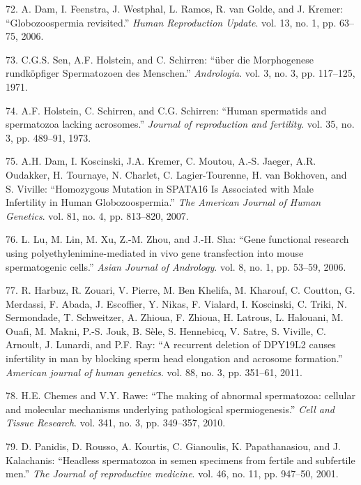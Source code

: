 \documentclass[12pt,a4paper,twoside]{ugathesis}
\theoremstyle{definition}
\theoremstyle{definition}
\theoremstyle{definition}
\theoremstyle{remark}
\begin{document}
\hypertarget{ref-Dam2006}{}
72. A. Dam, I. Feenstra, J. Westphal, L. Ramos, R. van Golde, and J.
Kremer: ``Globozoospermia revisited.'' \emph{Human Reproduction Update}.
vol. 13, no. 1, pp. 63--75, 2006.

\hypertarget{ref-Sen2009}{}
73. C.G.S. Sen, A.F. Holstein, and C. Schirren: ``über die Morphogenese
rundköpfiger Spermatozoen des Menschen.'' \emph{Andrologia}. vol. 3, no.
3, pp. 117--125, 1971.

\hypertarget{ref-Holstein1973}{}
74. A.F. Holstein, C. Schirren, and C.G. Schirren: ``Human spermatids
and spermatozoa lacking acrosomes.'' \emph{Journal of reproduction and
fertility}. vol. 35, no. 3, pp. 489--91, 1973.

\hypertarget{ref-Dam2007a}{}
75. A.H. Dam, I. Koscinski, J.A. Kremer, C. Moutou, A.-S. Jaeger, A.R.
Oudakker, H. Tournaye, N. Charlet, C. Lagier-Tourenne, H. van Bokhoven,
and S. Viville: ``Homozygous Mutation in SPATA16 Is Associated with Male
Infertility in Human Globozoospermia.'' \emph{The American Journal of
Human Genetics}. vol. 81, no. 4, pp. 813--820, 2007.

\hypertarget{ref-Lu2006}{}
76. L. Lu, M. Lin, M. Xu, Z.-M. Zhou, and J.-H. Sha: ``Gene functional
research using polyethylenimine-mediated in vivo gene transfection into
mouse spermatogenic cells.'' \emph{Asian Journal of Andrology}. vol. 8,
no. 1, pp. 53--59, 2006.

\hypertarget{ref-Harbuz2011}{}
77. R. Harbuz, R. Zouari, V. Pierre, M. Ben Khelifa, M. Kharouf, C.
Coutton, G. Merdassi, F. Abada, J. Escoffier, Y. Nikas, F. Vialard, I.
Koscinski, C. Triki, N. Sermondade, T. Schweitzer, A. Zhioua, F. Zhioua,
H. Latrous, L. Halouani, M. Ouafi, M. Makni, P.-S. Jouk, B. Sèle, S.
Hennebicq, V. Satre, S. Viville, C. Arnoult, J. Lunardi, and P.F. Ray:
``A recurrent deletion of DPY19L2 causes infertility in man by blocking
sperm head elongation and acrosome formation.'' \emph{American journal
of human genetics}. vol. 88, no. 3, pp. 351--61, 2011.

\hypertarget{ref-Chemes2010}{}
78. H.E. Chemes and V.Y. Rawe: ``The making of abnormal spermatozoa:
cellular and molecular mechanisms underlying pathological
spermiogenesis.'' \emph{Cell and Tissue Research}. vol. 341, no. 3, pp.
349--357, 2010.

\hypertarget{ref-Panidis2001}{}
79. D. Panidis, D. Rousso, A. Kourtis, C. Gianoulis, K. Papathanasiou,
and J. Kalachanis: ``Headless spermatozoa in semen specimens from
fertile and subfertile men.'' \emph{The Journal of reproductive
medicine}. vol. 46, no. 11, pp. 947--50, 2001.
\end{document}
